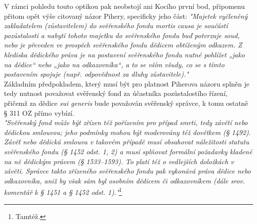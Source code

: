 \documentclass{article}
\begin{document}
 V rámci pohledu touto optikou pak neobstojí ani Kocího první bod, připomenu přitom opět výše citovaný názor Pihery, specificky jeho část: \textit{"Majetek vyčleněný zakladatelem (zůstavitelem) do svěřenského fondu mortis causa je součástí pozůstalosti a nabytí tohoto majetku do svěřenského fondu buď potvrzuje soud, nebo je převeden ve prospěch svěřenského fondu dědicem obtíženým odkazem. Z hlediska dědického práva je na postavení svěřenského fondu nutné pohlížet „jako na dědice“ nebo „jako na odkazovníka“, a to se vším všudy, co se s tímto postavením spojuje (např. odpovědnost za dluhy zůstavitele)."}\\
 
 
 Základním předpokladem, který musí být pro platnost Piherova názoru splněn je tedy nutnost považovat svěřenský fond za účastníka pozůstalostího řízení, přičemž za dědice \textit{sui generis} bude považován svěřenský správce, k tomu ostatně § 311 OZ přímo vybízí.\\
 
 \textit{"Svěřenský fond může být zřízen též pořízením pro případ smrti, tedy závětí nebo dědickou smlouvou; jeho podmínky mohou být moderovány též dovětkem (§ 1492). Závěť nebo dědická smlouva v takovém případě musí obsahovat náležitosti statutu svěřenského fondu (§ 1452 odst. 1, 2) a musí splňovat formální požadavky kladené na ně dědickým právem (§ 1533–1593). To platí též o vedlejších doložkách v závěti. Správce takto zřízeného svěřenského fondu pak vykonává práva dědice nebo odkazovníka, aniž by však sám byl osobním dědicem či odkazovníkem (dále srov. komentář k § 1451 a § 1452 odst. 1)."}\footnote{Tamtéž.}\\
 
\end{document}
